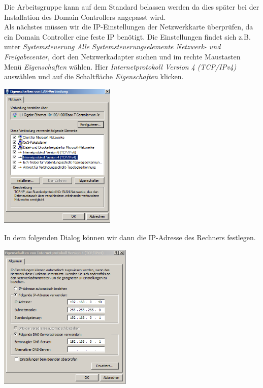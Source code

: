 \documentclass[12pt,a4paper,titlepage]{scrartcl} %
\begin{document}
Die Arbeitsgruppe kann auf dem Standard belassen werden da dies später bei der Installation des Domain Controllers angepasst wird.\\
Als nächstes müssen wir die IP-Einstellungen der Netzwerkkarte überprüfen, da ein Domain Controller eine feste IP benötigt. Die Einstellungen findet sich z.B. unter \emph{Systemsteuerung  Alle Systemsteuerungselemente  Netzwerk- und Freigabecenter}, dort den Netzwerkadapter suchen und im rechte Maustasten Menü \emph{Eigenschaften} wählen. Hier \emph{Internetprotokoll Version 4 (TCP/IPv4)} auswählen und auf die Schaltfläche \emph{Eigenschaften} klicken.\\ %

	\begin{center}\includegraphics[height=7cm]{Bilder/004}\\ \end{center}
	
In dem folgenden Dialog können wir dann die IP-Adresse des Rechners festlegen.\\ 

	\begin{center}\includegraphics[height=7cm]{Bilder/005}\\ \end{center}
	
\end{document}
